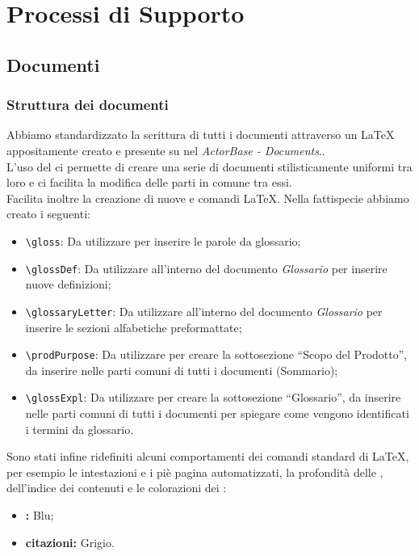 \documentclass{scalatekids-article}
\begin{document}
\section{Processi di Supporto}
\subsection{Documenti}
\subsubsection{Struttura dei documenti}
\label{sec:strutturadoc}
Abbiamo standardizzato la scrittura di tutti i documenti attraverso un
 \LaTeX\xspace appositamente creato e presente su
\textit{} nel  \textit{ActorBase -
  Documents}..\\ L'uso del  ci permette di creare una serie di documenti
stilisticamente uniformi tra loro e ci facilita la modifica delle parti in
comune tra essi.\\Facilita inoltre la creazione di nuove  e comandi
\LaTeX\xspace. Nella fattispecie abbiamo creato i seguenti:
\begin{itemize}
\item\verb=\gloss=: Da utilizzare per inserire le parole da glossario;
\item\verb=\glossDef=: Da utilizzare all'interno del documento \textit{Glossario} per inserire nuove definizioni;
\item\verb=\glossaryLetter=: Da utilizzare all'interno del documento \textit{Glossario} per inserire le sezioni alfabetiche preformattate;
\item\verb=\prodPurpose=: Da utilizzare per creare la sottosezione ``Scopo del Prodotto'', da inserire nelle parti comuni di tutti i documenti (Sommario);
\item\verb=\glossExpl=: Da utilizzare per creare la sottosezione ``Glossario'', da inserire nelle parti comuni di tutti i documenti per spiegare come vengono identificati i termini da glossario.
\end{itemize}
Sono stati infine ridefiniti alcuni comportamenti dei comandi standard di
\LaTeX\xspace, per esempio le intestazioni e i piè pagina automatizzati, la
profondità delle , dell'indice dei contenuti e le colorazioni dei
:
\begin{itemize}
\item\textbf{:} Blu;
\item\textbf{citazioni:} Grigio.
\end{itemize}
\end{document}
